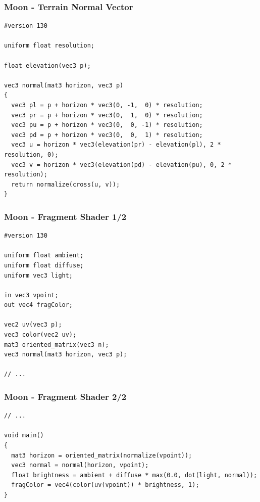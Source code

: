 \documentclass[aspectratio=169,11pt,xcolor=dvipsnames]{beamer}
\begin{document}
\begin{frame}[fragile]
  \frametitle{Moon {-} Terrain Normal Vector}
  \begin{verbatim}
#version 130

uniform float resolution;

float elevation(vec3 p);

vec3 normal(mat3 horizon, vec3 p)
{
  vec3 pl = p + horizon * vec3(0, -1,  0) * resolution;
  vec3 pr = p + horizon * vec3(0,  1,  0) * resolution;
  vec3 pu = p + horizon * vec3(0,  0, -1) * resolution;
  vec3 pd = p + horizon * vec3(0,  0,  1) * resolution;
  vec3 u = horizon * vec3(elevation(pr) - elevation(pl), 2 * resolution, 0);
  vec3 v = horizon * vec3(elevation(pd) - elevation(pu), 0, 2 * resolution);
  return normalize(cross(u, v));
}
  \end{verbatim}
\end{frame}

\begin{frame}[fragile]
  \frametitle{Moon {-} Fragment Shader 1/2}
  \begin{verbatim}
#version 130

uniform float ambient;
uniform float diffuse;
uniform vec3 light;

in vec3 vpoint;
out vec4 fragColor;

vec2 uv(vec3 p);
vec3 color(vec2 uv);
mat3 oriented_matrix(vec3 n);
vec3 normal(mat3 horizon, vec3 p);

// ...
  \end{verbatim}
\end{frame}

\begin{frame}[fragile]
  \frametitle{Moon {-} Fragment Shader 2/2}
  \begin{verbatim}
// ...

void main()
{
  mat3 horizon = oriented_matrix(normalize(vpoint));
  vec3 normal = normal(horizon, vpoint);
  float brightness = ambient + diffuse * max(0.0, dot(light, normal));
  fragColor = vec4(color(uv(vpoint)) * brightness, 1);
}
  \end{verbatim}
\end{frame}
\end{document}
